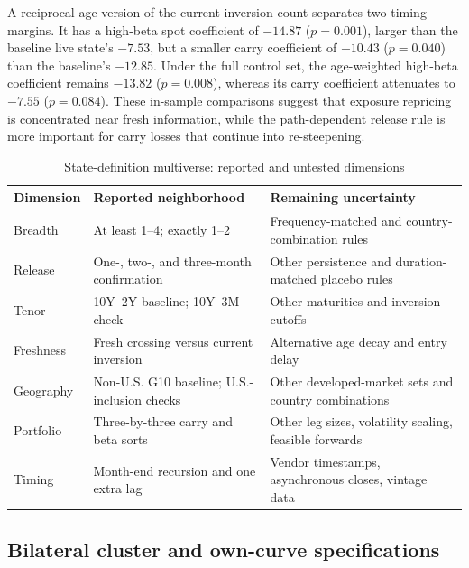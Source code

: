 A reciprocal-age version of the current-inversion count separates two timing margins. It has a high-beta spot coefficient of $-14.87$ ($p=0.001$), larger than the baseline live state's $-7.53$, but a smaller carry coefficient of $-10.43$ ($p=0.040$) than the baseline's $-12.85$. Under the full control set, the age-weighted high-beta coefficient remains $-13.82$ ($p=0.008$), whereas its carry coefficient attenuates to $-7.55$ ($p=0.084$). These in-sample comparisons suggest that exposure repricing is concentrated near fresh information, while the path-dependent release rule is more important for carry losses that continue into re-steepening.



\begin{table}[H]
\centering
\caption{State-definition multiverse: reported and untested dimensions}
\label{tab:multiverse}
\small
\begin{tabularx}{\textwidth}{>{\raggedright\arraybackslash}p{3.1cm} >{\raggedright\arraybackslash}X >{\raggedright\arraybackslash}X}
\toprule
Dimension & Reported neighborhood & Remaining uncertainty \\
\midrule
Breadth & At least 1--4; exactly 1--2 & Frequency-matched and country-combination rules \\
Release & One-, two-, and three-month confirmation & Other persistence and duration-matched placebo rules \\
Tenor & 10Y--2Y baseline; 10Y--3M check & Other maturities and inversion cutoffs \\
Freshness & Fresh crossing versus current inversion & Alternative age decay and entry delay \\
Geography & Non-U.S. G10 baseline; U.S.-inclusion checks & Other developed-market sets and country combinations \\
Portfolio & Three-by-three carry and beta sorts & Other leg sizes, volatility scaling, feasible forwards \\
Timing & Month-end recursion and one extra lag & Vendor timestamps, asynchronous closes, vintage data \\
\bottomrule
\end{tabularx}
\end{table}

\subsection{Bilateral cluster and own-curve specifications}

